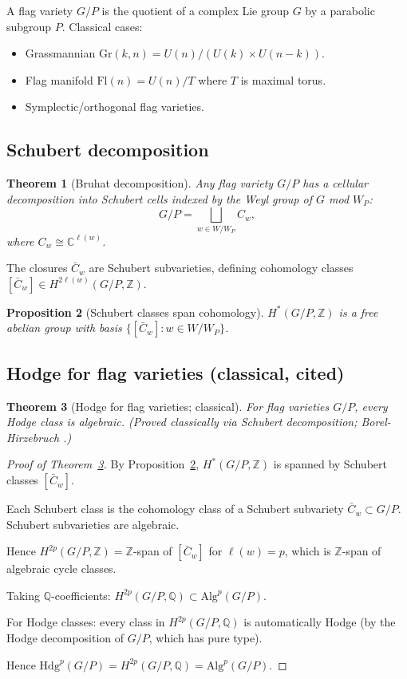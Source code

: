 \documentclass[11pt, a4paper]{amsart}
\newtheorem{theorem}{Theorem}[section]
\newtheorem{proposition}[theorem]{Proposition}
\theoremstyle{definition}
\newcommand{\Q}{\mathbb{Q}}
\newcommand{\C}{\mathbb{C}}
\newcommand{\Z}{\mathbb{Z}}
\begin{document}
A flag variety $G/P$ is the quotient of a complex Lie group $G$ by a
parabolic subgroup $P$. Classical cases:
\begin{itemize}
\item Grassmannian $\mathrm{Gr}(k, n) = U(n)/(U(k) \times U(n-k))$.
\item Flag manifold $\mathrm{Fl}(n) = U(n)/T$ where $T$ is maximal torus.
\item Symplectic/orthogonal flag varieties.
\end{itemize}

\subsection{Schubert decomposition}

\begin{theorem}[Bruhat decomposition]\label{thm:bruhat}
Any flag variety $G/P$ has a cellular decomposition into Schubert
cells indexed by the Weyl group of $G$ mod $W_P$:
\[
G/P = \bigsqcup_{w \in W/W_P} C_w,
\]
where $C_w \cong \C^{\ell(w)}$.
\end{theorem}

The closures $\bar C_w$ are Schubert subvarieties, defining cohomology
classes $[\bar C_w] \in H^{2 \ell(w)}(G/P, \Z)$.

\begin{proposition}[Schubert classes span cohomology]\label{prop:schubert}
$H^*(G/P, \Z)$ is a free abelian group with basis $\{[\bar C_w] : w \in W/W_P\}$.
\end{proposition}

\subsection{Hodge for flag varieties (classical, cited)}

\begin{theorem}[Hodge for flag varieties; classical]\label{thm:flag}
For flag varieties $G/P$, every Hodge class is algebraic. (Proved classically via Schubert decomposition; Borel-Hirzebruch \cite{BorelHirzebruch}.)
\end{theorem}

\begin{proof}[Proof of Theorem~\ref{thm:flag}]
By Proposition~\ref{prop:schubert}, $H^*(G/P, \Z)$ is spanned by
Schubert classes $[\bar C_w]$.

Each Schubert class is the cohomology class of a Schubert subvariety
$\bar C_w \subset G/P$. Schubert subvarieties are algebraic.

Hence $H^{2p}(G/P, \Z) = \Z$-span of $[\bar C_w]$ for $\ell(w) = p$,
which is $\Z$-span of algebraic cycle classes.

Taking $\Q$-coefficients: $H^{2p}(G/P, \Q) \subset \mathrm{Alg}^p(G/P)$.

For Hodge classes: every class in $H^{2p}(G/P, \Q)$ is automatically
Hodge (by the Hodge decomposition of $G/P$, which has pure type).

Hence $\mathrm{Hdg}^p(G/P) = H^{2p}(G/P, \Q) = \mathrm{Alg}^p(G/P)$.
\end{proof}
\end{document}
